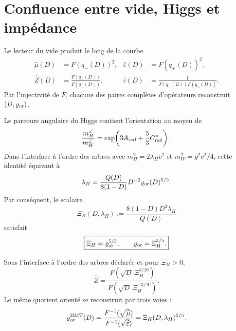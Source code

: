 \section{Confluence entre vide, Higgs et impédance}

Le lecteur du vide produit le long de la courbe
\begin{align}
 \widehat\mu(D)&=F(q_-(D))^2,
 &\widehat\varepsilon(D)&=F(q_+(D))^2,
 \label{rm:eq:curve-vacuum-D}\\
 \widehat Z(D)&=\frac{F(q_-(D))}{F(q_+(D))},
 &\widehat c(D)&=\frac1{F(q_-(D))F(q_+(D))}.
 \label{rm:eq:curve-Z-c-D}
\end{align}
Par l’injectivité de \(F\), chacune des paires complètes d’opérateurs reconstruit \((D,\varrho_{\rm or})\).

Le parcours angulaire du Higgs contient l’orientation au moyen de
\begin{equation}
 \frac{m_H^{\angle}}{m_W^{\angle}}
 =\exp\!\left(3A_{\rm rad}+\frac53C^*_{\rm rad}\right).
 \label{rm:eq:curve-HW-ratio}
\end{equation}
Dans l’interface à l’ordre des arbres avec \(m_H^2=2\lambda_Hv^2\) et \(m_W^2=g^2v^2/4\), cette identité équivaut à
\begin{equation}
 \lambda_H
 =\frac{Q(D)}{8(1-D)}D^{-3}
  \varrho_{\rm or}(D)^{5/3}.
 \label{rm:eq:curve-lambda-H}
\end{equation}
Par conséquent, le scalaire
\begin{equation}
 \Xi_H(D,\lambda_H)
 :=\frac{8(1-D)D^3\lambda_H}{Q(D)}
 \label{rm:eq:curve-Xi-H}
\end{equation}
satisfait
\begin{equation}
 \boxed{
 \Xi_H=\varrho_{\rm or}^{5/3},
 \qquad
 \varrho_{\rm or}=\Xi_H^{3/5}.}
 \label{rm:eq:curve-Higgs-rho}
\end{equation}

\begin{corollary}
\label{rm:cor:curve-Higgs-impedance} Sous l’interface à l’ordre des arbres déclarée et pour \(\Xi_H>0\),
\begin{equation}
 \boxed{
 \widehat Z
 =\frac{
 F\!\left(\sqrt D\,\Xi_H^{3/10}\right)}
 {F\!\left(\sqrt D\,\Xi_H^{-3/10}\right)}.}
 \label{rm:eq:curve-Higgs-Z}
\end{equation}
Le même quotient orienté se reconstruit par trois voies :
\begin{equation}
 \varrho_{\rm or}^{\rm HMT}(D)
 =\frac{F^{-1}(\sqrt{\widehat\mu})}
        {F^{-1}(\sqrt{\widehat\varepsilon})}
 =\Xi_H(D,\lambda_H)^{3/5}.
 \label{rm:eq:curve-triple-confluence}
\end{equation}
\end{corollary}

